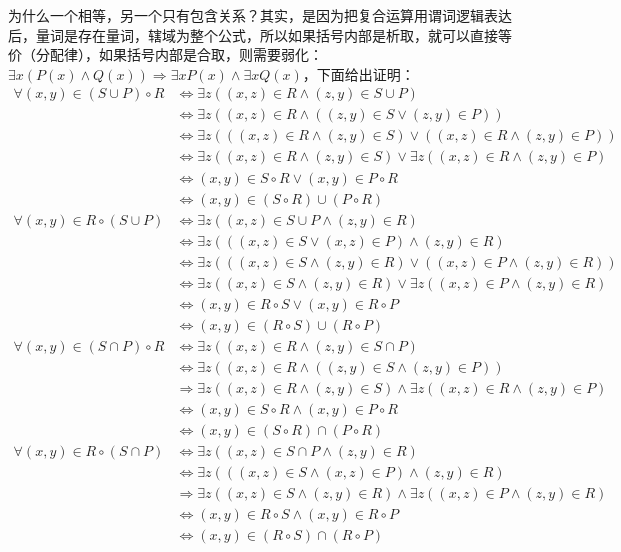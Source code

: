 为什么一个相等，另一个只有包含关系？其实，是因为把复合运算用谓词逻辑表达后，量词是存在量词，辖域为整个公式，所以如果括号内部是析取，就可以直接等价（分配律），如果括号内部是合取，则需要弱化：$\exists x(P(x) \land Q(x))\Rightarrow \exists xP(x)\land \exists xQ(x)$，下面给出证明：
\begin{align*}
\forall (x,y)\in(S\cup P)\circ R &\Leftrightarrow \exists z((x,z)\in R\land(z,y)\in S\cup P)\\
&\Leftrightarrow \exists z((x,z)\in R\land((z,y)\in S\lor (z,y)\in P))\\
&\Leftrightarrow \exists z(((x,z)\in R\land(z,y)\in S)\lor((x,z)\in R\land(z,y)\in P))\\
&\Leftrightarrow \exists z((x,z)\in R\land(z,y)\in S)\lor \exists z((x,z)\in R\land(z,y)\in P)\\
&\Leftrightarrow (x,y)\in S\circ R\lor (x,y)\in P\circ R\\
&\Leftrightarrow (x,y)\in (S\circ R)\cup(P\circ R)\\
\forall (x,y)\in R\circ(S\cup P) &\Leftrightarrow \exists z((x,z)\in S\cup P\land(z,y)\in R)\\
&\Leftrightarrow \exists z(((x,z)\in S\lor(x,z)\in P)\land(z,y)\in R)\\
&\Leftrightarrow \exists z(((x,z)\in S\land(z,y)\in R)\lor((x,z)\in P\land(z,y)\in R))\\
&\Leftrightarrow \exists z((x,z)\in S\land(z,y)\in R)\lor\exists z((x,z)\in P\land(z,y)\in R)\\
&\Leftrightarrow (x,y)\in R\circ S\lor(x,y)\in R\circ P\\
&\Leftrightarrow (x,y)\in (R\circ S)\cup(R\circ P)\\
\forall (x,y)\in(S\cap P)\circ R &\Leftrightarrow \exists z((x,z)\in R\land(z,y)\in S\cap P)\\
&\Leftrightarrow \exists z((x,z)\in R\land((z,y)\in S\land(z,y)\in P))\\
&\Rightarrow \exists z((x,z)\in R\land(z,y)\in S)\land\exists z((x,z)\in R\land(z,y)\in P)\\
&\Leftrightarrow (x,y)\in S\circ R\land(x,y)\in P\circ R\\
&\Leftrightarrow (x,y)\in (S\circ R)\cap(P\circ R)\\
\forall (x,y)\in R\circ(S\cap P) &\Leftrightarrow \exists z((x,z)\in S\cap P\land(z,y)\in R)\\
&\Leftrightarrow \exists z(((x,z)\in S\land(x,z)\in P)\land(z,y)\in R)\\
&\Rightarrow \exists z((x,z)\in S\land(z,y)\in R)\land\exists z((x,z)\in P\land(z,y)\in R)\\
&\Leftrightarrow (x,y)\in R\circ S\land(x,y)\in R\circ P\\
&\Leftrightarrow (x,y)\in (R\circ S)\cap(R\circ P)
\end{align*}

